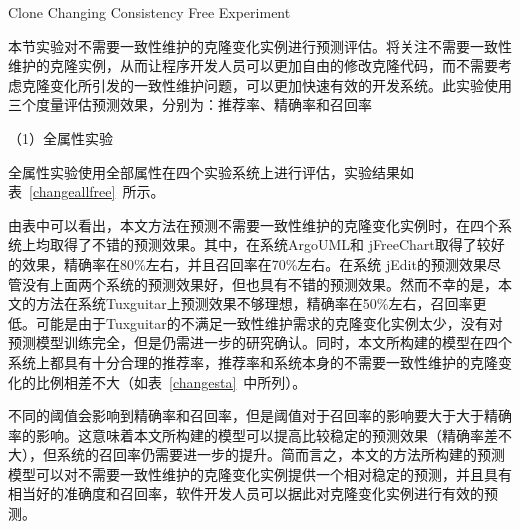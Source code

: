
{Clone Changing Consistency Free Experiment}

本节实验对不需要一致性维护的克隆变化实例进行预测评估。将关注不需要一致性维护的克隆实例，从而让程序开发人员可以更加自由的修改克隆代码，而不需要考虑克隆变化所引发的一致性维护问题，可以更加快速有效的开发系统。此实验使用三个度量评估预测效果，分别为：推荐率、精确率和召回率

（1）全属性实验

全属性实验使用全部属性在四个实验系统上进行评估，实验结果如表~\ref{changeallfree}~所示。

由表中可以看出，本文方法在预测不需要一致性维护的克隆变化实例时，在四个系统上均取得了不错的预测效果。其中，在系统ArgoUML和 jFreeChart取得了较好的效果，精确率在80\%左右，并且召回率在70\%左右。在系统 jEdit的预测效果尽管没有上面两个系统的预测效果好，但也具有不错的预测效果。然而不幸的是，本文的方法在系统Tuxguitar上预测效果不够理想，精确率在50\%左右，召回率更低。可能是由于Tuxguitar的不满足一致性维护需求的克隆变化实例太少，没有对预测模型训练完全，但是仍需进一步的研究确认。同时，本文所构建的模型在四个系统上都具有十分合理的推荐率，推荐率和系统本身的不需要一致性维护的克隆变化的比例相差不大（如表~\ref{changesta}~中所列）。

不同的阈值会影响到精确率和召回率，但是阈值对于召回率的影响要大于大于精确率的影响。这意味着本文所构建的模型可以提高比较稳定的预测效果（精确率差不大），但系统的召回率仍需要进一步的提升。简而言之，本文的方法所构建的预测模型可以对不需要一致性维护的克隆变化实例提供一个相对稳定的预测，并且具有相当好的准确度和召回率，软件开发人员可以据此对克隆变化实例进行有效的预测。


